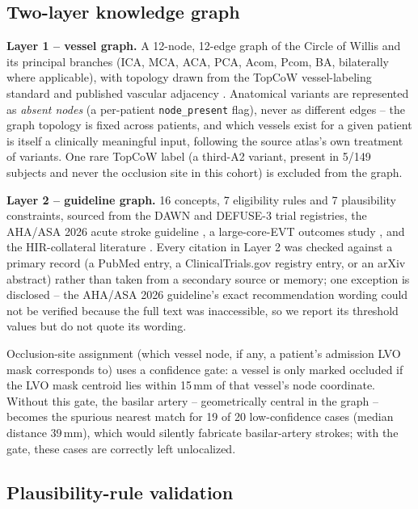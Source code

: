\documentclass[conference]{IEEEtran}
\begin{document}
\subsection{Two-layer knowledge graph}
\label{sec:kg}

\textbf{Layer 1 -- vessel graph.} A 12-node, 12-edge graph of the Circle of Willis and its principal branches (ICA, MCA, ACA, PCA, Acom, Pcom, BA, bilaterally where applicable), with topology drawn from the TopCoW vessel-labeling standard \cite{topcow2023} and published vascular adjacency \cite{alastruey2007}. Anatomical variants are represented as \emph{absent nodes} (a per-patient \texttt{node\_present} flag), never as different edges -- the graph topology is fixed across patients, and which vessels exist for a given patient is itself a clinically meaningful input, following the source atlas's own treatment of variants. One rare TopCoW label (a third-A2 variant, present in 5/149 subjects and never the occlusion site in this cohort) is excluded from the graph.

\textbf{Layer 2 -- guideline graph.} 16 concepts, 7 eligibility rules and 7 plausibility constraints, sourced from the DAWN \cite{dawn2018} and DEFUSE-3 \cite{defuse3_2018} trial registries, the AHA/ASA 2026 acute stroke guideline \cite{ahaasa2026}, a large-core-EVT outcomes study \cite{kim2026}, and the HIR-collateral literature \cite{olivot2014}. Every citation in Layer 2 was checked against a primary record (a PubMed entry, a ClinicalTrials.gov registry entry, or an arXiv abstract) rather than taken from a secondary source or memory; one exception is disclosed -- the AHA/ASA 2026 guideline's exact recommendation wording could not be verified because the full text was inaccessible, so we report its threshold values but do not quote its wording.

Occlusion-site assignment (which vessel node, if any, a patient's admission LVO mask corresponds to) uses a confidence gate: a vessel is only marked occluded if the LVO mask centroid lies within 15\,mm of that vessel's node coordinate. Without this gate, the basilar artery -- geometrically central in the graph -- becomes the spurious nearest match for 19 of 20 low-confidence cases (median distance 39\,mm), which would silently fabricate basilar-artery strokes; with the gate, these cases are correctly left unlocalized.

\subsection{Plausibility-rule validation}
\label{sec:validation}
\end{document}
